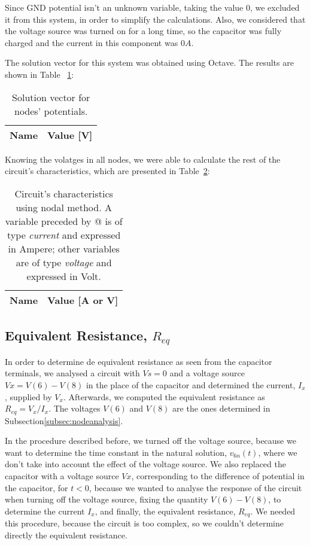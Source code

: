 Since GND potential isn't an unknown variable, taking the value 0, we excluded it from this system, in order to simplify the calculations. Also, we considered that the voltage source was turned on for a long time, so the capacitor was fully charged and the current in this component was $0A$.

The solution vector for this system was obtained using Octave. The results are shown in Table ~\ref{tab:node1}:

\begin{table}[H]
  \centering
  \begin{tabular}{|l|r|}
    \hline    
    {\bf Name} & {\bf Value [V]} \\ \hline
    
  \end{tabular}
  \caption{Solution vector for nodes' potentials.}
  \label{tab:node1}
\end{table}

Knowing the volatges in all nodes, we were able to calculate the rest of the circuit's characteristics, which are presented in Table~\ref{tab:nodetab1}:

\begin{table}[H]
  \centering
  \begin{tabular}{|l|r|}
    \hline    
    {\bf Name} & {\bf Value [A or V]} \\ \hline
    
  \end{tabular}
  \caption{Circuit's characteristics using nodal method. A variable preceded by @ is of type {\em current}
    and expressed in Ampere; other variables are of type {\it voltage} and expressed in
    Volt.}
  \label{tab:nodetab1}
\end{table}

\subsection{Equivalent Resistance, $R_{eq}$}
\label{subsec:eqresist}

In order to determine de equivalent resistance as seen from the capacitor terminals, we analysed a circuit with $Vs=0$ and a voltage source $Vx = V(6)-V(8)$ in the place of the capacitor and determined the current, $I_x$, supplied by $V_x$. Afterwards, we computed the equivalent resistance as $R_{eq}=V_x/I_x$. The voltages $V(6)$ and $V(8)$ are the ones determined in Subsection\ref{subsec:nodeanalysis}.

In the procedure described before, we turned off the voltage source, because we want to determine the time constant in the natural solution, $v_{6n}(t)$, where we don't take into account the effect of the voltage source. We also replaced the capacitor with a voltage source $Vx$, corresponding to the difference of potential in the capacitor, for $t<0$, because we wanted to analyse the response of the circuit when turning off the voltage source, fixing the quantity $V(6)-V(8)$, to determine the current $I_x$, and finally, the equivalent resistance, $R_{eq}$. We needed this procedure, because the circuit is too complex, so we couldn't determine directly the equivalent resistance.

